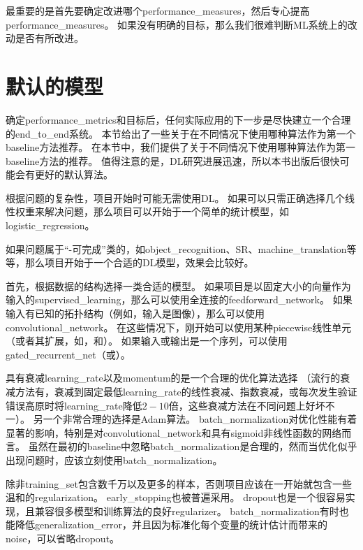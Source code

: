 最重要的是首先要确定改进哪个\gls{performance_measures}，然后专心提高\gls{performance_measures}。
如果没有明确的目标，那么我们很难判断\gls{ML}系统上的改动是否有所改进。


\section{默认的模型}
\label{sec:default_baseline_models}
确定\gls{performance_metrics}和目标后，任何实际应用的下一步是尽快建立一个合理的\gls{end_to_end}系统。
本节给出了一些关于在不同情况下使用哪种算法作为第一个\gls{baseline}方法推荐。
在本节中，我们提供了关于不同情况下使用哪种算法作为第一\gls{baseline}方法的推荐。
值得注意的是，\gls{DL}研究进展迅速，所以本书出版后很快可能会有更好的默认算法。

根据问题的复杂性，项目开始时可能无需使用\gls{DL}。
如果可以只需正确选择几个线性权重来解决问题，那么项目可以开始于一个简单的统计模型，如\gls{logistic_regression}。


如果问题属于``-可完成''类的，如\gls{object_recognition}、\gls{SR}、\gls{machine_translation}等等，那么项目开始于一个合适的\gls{DL}模型，效果会比较好。


首先，根据数据的结构选择一类合适的模型。
如果项目是以固定大小的向量作为输入的\gls{supervised_learning}，那么可以使用全连接的\gls{feedforward_network}。
如果输入有已知的拓扑结构（例如，输入是图像），那么可以使用\gls{convolutional_network}。
在这些情况下，刚开始可以使用某种\gls{piecewise}线性单元（或者其扩展，如，和）。
如果输入或输出是一个序列，可以使用\gls{gated_recurrent_net}（或）。


具有衰减\gls{learning_rate}以及\gls{momentum}的是一个合理的优化算法选择
（流行的衰减方法有，衰减到固定最低\gls{learning_rate}的线性衰减、指数衰减，或每次发生验证错误高原时将\gls{learning_rate}降低$2-10$倍，这些衰减方法在不同问题上好坏不一）。
另一个非常合理的选择是Adam算法。
\gls{batch_normalization}对优化性能有着显著的影响，特别是对\gls{convolutional_network}和具有\gls{sigmoid}非线性函数的网络而言。
虽然在最初的\gls{baseline}中忽略\gls{batch_normalization}是合理的，然而当优化似乎出现问题时，应该立刻使用\gls{batch_normalization}。



除非\gls{training_set}包含数千万以及更多的样本，否则项目应该在一开始就包含一些温和的\gls{regularization}。 
\gls{early_stopping}也被普遍采用。
\gls{dropout}也是一个很容易实现，且兼容很多模型和训练算法的良好\gls{regularizer}。
\gls{batch_normalization}有时也能降低\gls{generalization_error}，并且因为标准化每个变量的统计估计而带来的\gls{noise}，可以省略\gls{dropout}。


